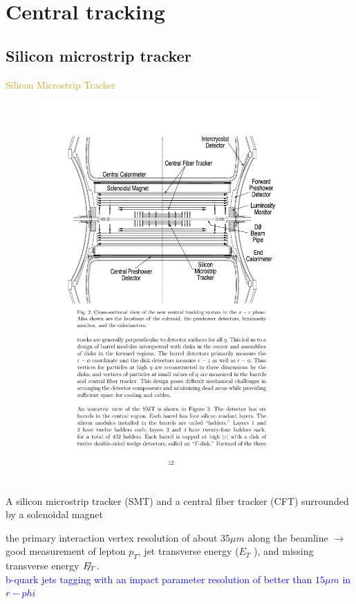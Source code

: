 
\section{Central tracking}

\subsection{Silicon microstrip tracker}

\begin{frame}{\textcolor{Goldenrod}{Silicon Microstrip Tracker}}
  \begin{overlayarea}{\textwidth}{\textheight}
    \begin{figure}[h]
      \centering
      \includegraphics[height=0.5\textheight]{./Images/08_CT}
    \end{figure}

    \itt[<only@+>]
  \item
    A silicon microstrip tracker (SMT) and a central fiber tracker
    (CFT) surrounded by a solenoidal magnet

  \item
    the primary interaction vertex resolution of about $35 \mu m $
    along the beamline $\to$ \alert{ good measurement of lepton $p_T$, jet
      transverse energy ($E_T$ ), and missing transverse energy
      $\slashed{E_T}$. }\\
    \textcolor{blue}{{\small b-quark jets tagging with an impact parameter resolution of better
      than $15 \mu m$ in $r-phi$}}
    \tti
  \end{overlayarea}
\end{frame}


